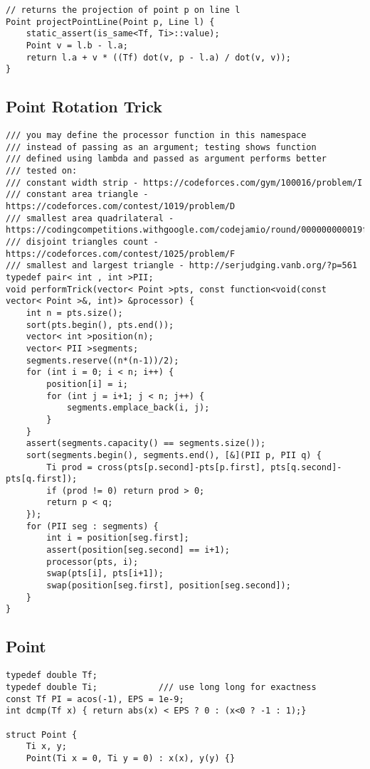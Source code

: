 \documentclass[FSZ,a4paper,onesided]{article}
\begin{document}
\begin{multicols*}{\COLS}
\begin{lstlisting}
// returns the projection of point p on line l
Point projectPointLine(Point p, Line l) {
    static_assert(is_same<Tf, Ti>::value);
    Point v = l.b - l.a;
    return l.a + v * ((Tf) dot(v, p - l.a) / dot(v, v));
}\end{lstlisting}
\subsection{Point Rotation Trick}
\begin{lstlisting}
/// you may define the processor function in this namespace
/// instead of passing as an argument; testing shows function
/// defined using lambda and passed as argument performs better
/// tested on:
/// constant width strip - https://codeforces.com/gym/100016/problem/I
/// constant area triangle - https://codeforces.com/contest/1019/problem/D
/// smallest area quadrilateral - https://codingcompetitions.withgoogle.com/codejamio/round/000000000019ff03/00000000001b5e89
/// disjoint triangles count - https://codeforces.com/contest/1025/problem/F
/// smallest and largest triangle - http://serjudging.vanb.org/?p=561
typedef pair< int , int >PII;
void performTrick(vector< Point >pts, const function<void(const vector< Point >&, int)> &processor) {
    int n = pts.size();
    sort(pts.begin(), pts.end());
    vector< int >position(n);
    vector< PII >segments;
    segments.reserve((n*(n-1))/2);
    for (int i = 0; i < n; i++) {
        position[i] = i;
        for (int j = i+1; j < n; j++) {
            segments.emplace_back(i, j);
        }
    }
    assert(segments.capacity() == segments.size());
    sort(segments.begin(), segments.end(), [&](PII p, PII q) {
        Ti prod = cross(pts[p.second]-pts[p.first], pts[q.second]-pts[q.first]);
        if (prod != 0) return prod > 0;
        return p < q;
    });
    for (PII seg : segments) {
        int i = position[seg.first];
        assert(position[seg.second] == i+1);
        processor(pts, i);
        swap(pts[i], pts[i+1]);
        swap(position[seg.first], position[seg.second]);
    }
}\end{lstlisting}
\subsection{Point}
\begin{lstlisting}
typedef double Tf;
typedef double Ti;            /// use long long for exactness
const Tf PI = acos(-1), EPS = 1e-9;
int dcmp(Tf x) { return abs(x) < EPS ? 0 : (x<0 ? -1 : 1);}
 
struct Point {
    Ti x, y;
    Point(Ti x = 0, Ti y = 0) : x(x), y(y) {}
 

\end{lstlisting}
\end{multicols*}
\end{document}
